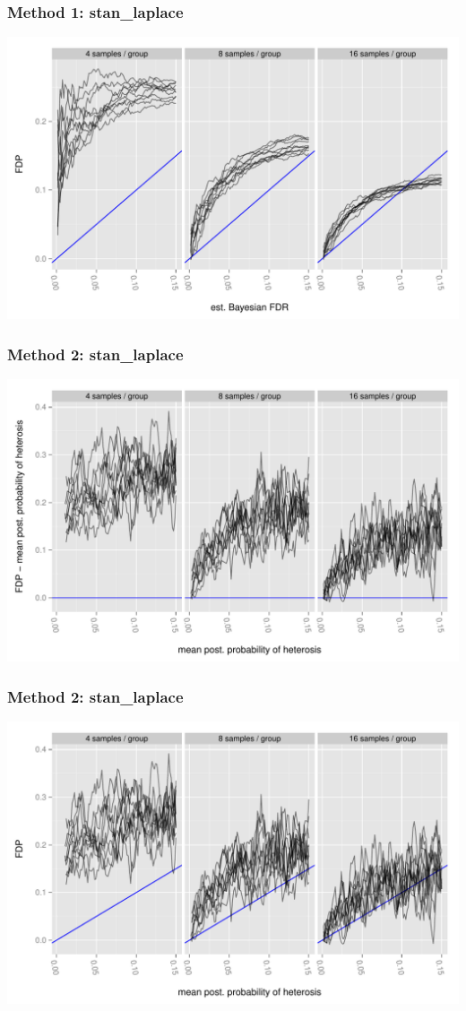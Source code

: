 \documentclass[handout]{beamer}
\numberwithin{equation}{section}
\begin{document}
\begin{frame}
\frametitle{Method 1: stan\_laplace}
\begin{center}
\includegraphics[scale=0.5]{fdr-method1-stan2}
\end{center}
\end{frame}

\begin{frame}
\frametitle{Method 2: stan\_laplace}
\begin{center}
\includegraphics[scale=0.5]{fdr-method2-stan1}
\end{center}
\end{frame}

\begin{frame}
\frametitle{Method 2: stan\_laplace}
\begin{center}
\includegraphics[scale=0.5]{fdr-method2-stan2}
\end{center}
\end{frame}
\end{document}
